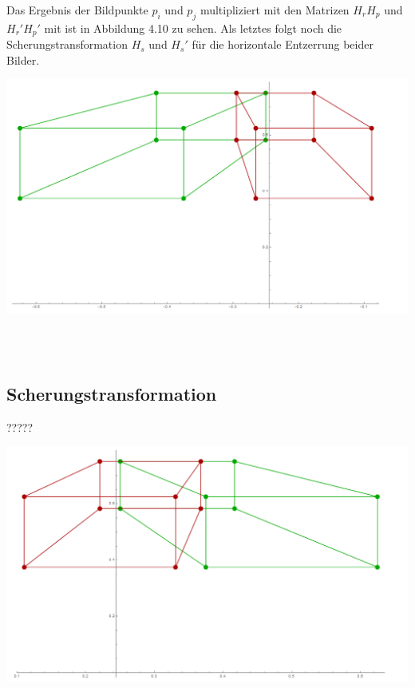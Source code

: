 Das Ergebnis der Bildpunkte $p_i$ und $p_j$ multipliziert mit den Matrizen $H_rH_p$ und $H_r'H_p'$ mit ist in Abbildung 4.10 zu sehen. Als letztes folgt noch die Scherungstransformation $H_s$ und $H_s'$ für die horizontale Entzerrung beider Bilder.\\ 

\begin{minipage}{\linewidth}
	\centering
	\includegraphics[width=1.\linewidth]{images/Rectification_HrHp_same_Solutions.png}
\end{minipage}\\ \\

\subsection{Scherungstransformation}

?????

\begin{minipage}{\linewidth}
	\centering
	\includegraphics[width=1.\linewidth]{images/Rectification_HsHrHp_same_Solutions.png}
\end{minipage}\\ \\

